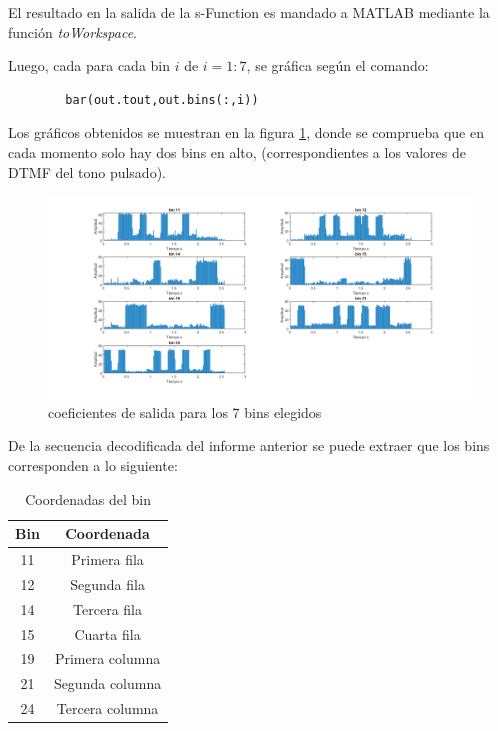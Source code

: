 \documentclass[letterpaper,onecolumn,10pt,journal,final]{IEEEtran}
\begin{document}
\begin{enumerate}[1)]
    
    El resultado en la salida de la s-Function es mandado a \textsc{MATLAB} mediante la función \textit{toWorkspace}.
    
    Luego, cada para cada bin $i$ de $i=1:7$, se gráfica según el comando:
    
    \begin{lstlisting}
        bar(out.tout,out.bins(:,i))
    \end{lstlisting}
    
    Los gráficos obtenidos se muestran en la figura \ref{fig:VII2}, donde se comprueba que en cada momento solo hay dos bins en alto, (correspondientes a los valores de DTMF del tono pulsado).
    \begin{figure}[H]
        \centering
        \includegraphics[width=\linewidth]{Figuras/VII2.png}
        \caption{coeficientes de salida para los 7 bins elegidos}
        \label{fig:VII2}
    \end{figure}
    De la secuencia decodificada del informe anterior se puede extraer que los bins corresponden a lo siguiente:
    \begin{table}[H]
        \centering
        \begin{tabular}{|c|c|}
        \hline
         Bin & Coordenada \\
         \hline
         11  & Primera fila \\ 
         12  & Segunda fila \\ 
         14  & Tercera fila \\ 
         15  & Cuarta fila \\ 
         19  & Primera columna \\ 
         21  & Segunda columna \\ 
         24  & Tercera columna \\
         \hline
        \end{tabular}
        \caption{Coordenadas del bin}
        \label{tab:bins}

\end{table}
\end{enumerate}
\end{document}
